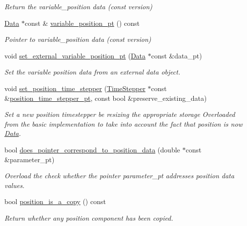 \begin{DoxyCompactItemize}
\begin{DoxyCompactList}\small\item\em Return the variable\+\_\+position data (const version) \end{DoxyCompactList}\item 
\hyperlink{classoomph_1_1Data}{Data} $\ast$const  \& \hyperlink{classoomph_1_1SolidNode_ae9a8abd197728f5555730131fa0f6971}{variable\+\_\+position\+\_\+pt} () const
\begin{DoxyCompactList}\small\item\em Pointer to variable\+\_\+position data (const version) \end{DoxyCompactList}\item 
void \hyperlink{classoomph_1_1SolidNode_abd91751e0695df391ecd0e8a9249eb4f}{set\+\_\+external\+\_\+variable\+\_\+position\+\_\+pt} (\hyperlink{classoomph_1_1Data}{Data} $\ast$const \&data\+\_\+pt)
\begin{DoxyCompactList}\small\item\em Set the variable position data from an external data object. \end{DoxyCompactList}\item 
void \hyperlink{classoomph_1_1SolidNode_a12b206264401d5b2ff6aefff386bdca4}{set\+\_\+position\+\_\+time\+\_\+stepper} (\hyperlink{classoomph_1_1TimeStepper}{Time\+Stepper} $\ast$const \&\hyperlink{classoomph_1_1Node_a89175b154594ba5b1a6cdde6f385dc71}{position\+\_\+time\+\_\+stepper\+\_\+pt}, const bool \&preserve\+\_\+existing\+\_\+data)
\begin{DoxyCompactList}\small\item\em Set a new position timestepper be resizing the appropriate storage Overloaded from the basic implementation to take into account the fact that position is now \hyperlink{classoomph_1_1Data}{Data}. \end{DoxyCompactList}\item 
bool \hyperlink{classoomph_1_1SolidNode_a33be0ea0fc6c0575d20f303b19a7d4b5}{does\+\_\+pointer\+\_\+correspond\+\_\+to\+\_\+position\+\_\+data} (double $\ast$const \&parameter\+\_\+pt)
\begin{DoxyCompactList}\small\item\em Overload the check whether the pointer parameter\+\_\+pt addresses position data values. \end{DoxyCompactList}\item 
bool \hyperlink{classoomph_1_1SolidNode_aa8d9a8e77ccc142be77767b33c09532a}{position\+\_\+is\+\_\+a\+\_\+copy} () const
\begin{DoxyCompactList}\small\item\em Return whether any position component has been copied. \end{DoxyCompactList}\item 

\end{DoxyCompactItemize}
